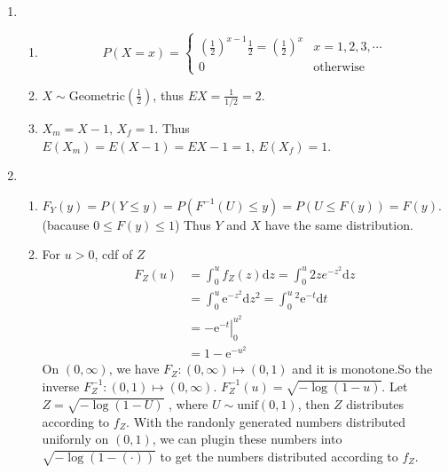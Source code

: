 \documentclass{article}
\begin{document}
\begin{enumerate}[leftmargin = 0 em, label = \arabic*., font = \bfseries]
\item \begin{enumerate}
	\item \[P(X = x ) =\begin{cases}
	 (\frac{1}{2})^{x-1}\frac{1}{2} = (\frac{1}{2})^x & x = 1,2,3,\cdots\\
	 0 & \mathrm{otherwise}
	 \end{cases}\]


	 \item $X \sim \mathrm{Geometric}(\frac{1}{2})$, thus $EX = \frac{1}{1/2} = 2$.

	 \item $X_m = X-1,\, X_f = 1.$ Thus $E(X_m) = E(X-1) = EX -1 = 1,\, E(X_f) = 1 $.

\end{enumerate}

\item \begin{enumerate}
	\item $F_Y(y) = P(Y\leq y) = P(F^{-1}(U)\leq y)=P(U\leq F(y)) = F(y).$ (bacause $0\leq F(y) \leq 1$) Thus $Y$ and $X$ have the same distribution.

	\item For $u > 0$, cdf of $Z$
	\begin{align*}
	F_Z(u) &= \int_{0}^u f_Z (z) \mathrm{d}z = \int_{0}^u 2z e^{-z^2}\mathrm{d}z\\
	&= \int_{0}^u \mathrm{e}^{-z^2}\mathrm{d}z^2 = \int_{0}^u^2 \mathrm{e}^{-t}\mathrm{d}t\\
	& =\left.-\mathrm{e}^{-t}\right|_{0}^{u^2}\\
	&= 1 - \mathrm{e}^{-u^2}
	\end{align*}
	On $(0,\infty)$, we have $F_Z: (0,\infty)\mapsto (0,1)$ and it is monotone.So the inverse $F_Z^{-1}: (0,1)\mapsto (0,\infty)$.
	$F_Z^{-1}(u) = \sqrt{-\log (1-u)}$. Let $Z = \sqrt{-\log (1-U)} $ , where $U \sim \mathrm{unif}(0,1)$, then $Z$ distributes according to $f_Z$. With the randonly generated numbers distributed unifornly on $(0,1)$, we can plugin these numbers into $\sqrt{-\log (1- (\cdot))}$ to get the numbers distributed according to $f_Z$.  
\end{enumerate}


 	\end{enumerate}


	
	
	
	
\end{document}
